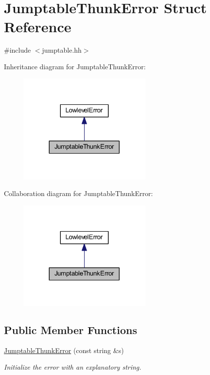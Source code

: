 \hypertarget{struct_jumptable_thunk_error}{}\section{Jumptable\+Thunk\+Error Struct Reference}
\label{struct_jumptable_thunk_error}


{\ttfamily \#include $<$jumptable.\+hh$>$}



Inheritance diagram for Jumptable\+Thunk\+Error\+:
\nopagebreak
\begin{figure}[H]
\begin{center}
\leavevmode
\includegraphics[width=188pt]{struct_jumptable_thunk_error__inherit__graph}
\end{center}
\end{figure}


Collaboration diagram for Jumptable\+Thunk\+Error\+:
\nopagebreak
\begin{figure}[H]
\begin{center}
\leavevmode
\includegraphics[width=188pt]{struct_jumptable_thunk_error__coll__graph}
\end{center}
\end{figure}
\subsection*{Public Member Functions}
\begin{DoxyCompactItemize}
\item 
\mbox{\hyperlink{struct_jumptable_thunk_error_a1044f6b610a293ea9c07dc4aa12313cf}{Jumptable\+Thunk\+Error}} (const string \&s)
\begin{DoxyCompactList}\small\item\em Initialize the error with an explanatory string. \end{DoxyCompactList}\end{DoxyCompactItemize}

